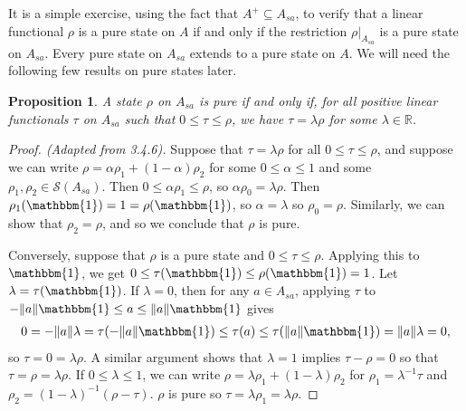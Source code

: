 \documentclass[12pt,a4paper]{amsart}
\theoremstyle{plain}
\newtheorem{prop}{Proposition}
\theoremstyle{definition}
\newcommand{\1}{\mathbbm{1}}
\newcommand{\R}{\mathbb{R}}
\renewcommand{\S}[1]{\mathscr{S}(#1)}
\begin{document}
It is a simple exercise, using the fact that $A^+\subseteq A_{sa}$, to verify that a linear functional 
$\rho$ is a pure state on $A$ if and only if the restriction $\rho|_{A_{sa}}$ is a pure state on $A_{sa}$.
Every pure state on $A_{sa}$ extends to a pure state on $A$.  %
We will need the following few results on pure states later.
\begin{prop}\label{pure1}
	A state $\rho$ on $A_{sa}$ is pure if and only if, for all positive linear functionals $\tau$ on $A_{sa}$
	such that $0\leq\tau\leq\rho$, we have $\tau =\lambda\rho$ for some $\lambda\in\R$.
\end{prop}
\begin{proof}[Proof. (Adapted from 3.4.6)]
	Suppose that $\tau =\lambda\rho$ for all $0\leq\tau\leq\rho$, and suppose we can write 
	$\rho=\alpha\rho_1+(1-\alpha)\rho_2$ for some $0\leq\alpha\leq1$ and some $\rho_1,\rho_2 \in \S{A_{sa}}$. 
	Then $0\leq\alpha\rho_1\leq\rho$, so $\alpha\rho_0 = \lambda\rho$. Then $\rho_1(\1)=1=\rho(\1)$, so 
	$\alpha = \lambda$ so $\rho_0 =\rho$. Similarly, we can show that $\rho_2=\rho$, and so we conclude that 
	$\rho$ is pure.
	
	Conversely, suppose that $\rho$ is a pure state and $0\leq\tau\leq\rho$. Applying this to $\1$, we get 
	$0\leq\tau(\1)\leq\rho(\1) = 1$. Let $\lambda = \tau(\1)$.
	If $\lambda=0$, then for any $a\in A_{sa}$, applying $\tau$ to $-\|a\|\1\leq a\leq\|a\|\1$ gives
	\begin{align*}
		0=-\|a\|\lambda=\tau(-\|a\|\1)\leq\tau(a)\leq\tau(\|a\|\1)=\|a\|\lambda=0,
	\end{align*}
	so $\tau=0=\lambda\rho$. 
	A similar argument shows that $\lambda=1$ implies $\tau-\rho=0$ so that $\tau=\rho=\lambda\rho$.
	If $0\leq\lambda\leq 1$, we can write $\rho=\lambda\rho_1+(1-\lambda)\rho_2$ for $\rho_1=\lambda^{-1}\tau$ 
	and $\rho_2=(1-\lambda)^{-1}(\rho-\tau)$. $\rho$ is pure so $\tau=\lambda\rho_1=\lambda\rho$.
	
\end{proof}
\end{document}
